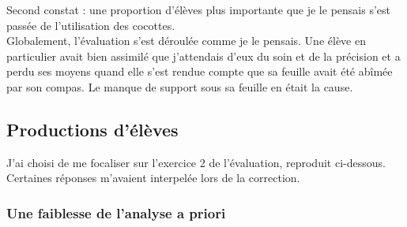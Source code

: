 Second constat : une proportion d'élèves plus importante que je le pensais s'est passée de l'utilisation des cocottes.\\

Globalement, l'évaluation s'est déroulée comme je le pensais. Une élève en particulier avait bien assimilé que j'attendais d'eux du soin et de la précision et a perdu ses moyens quand elle s'est rendue compte que sa feuille avait été abîmée par son compas. Le manque de support sous sa feuille en était la cause.

\newpage
\subsection{Productions d'élèves}

J'ai choisi de me focaliser sur l'exercice 2 de l'évaluation, reproduit ci-dessous. Certaines réponses m'avaient interpelée lors de la correction.
\begin{figure}[!h]
\end{figure}

\subsubsection*{Une faiblesse de l'analyse a priori}
\begin{figure}[!h]
\end{figure}

